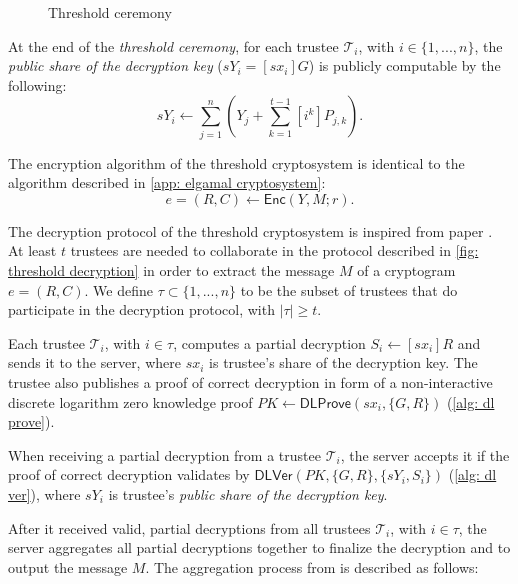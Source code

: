 \begin{figure}[ht]
    \caption{Threshold ceremony}
    \label{fig: threshold ceremony}
\end{figure}

At the end of the \textit{threshold ceremony}, for each trustee $\mathcal{T}_i$, with $i \in \{1, ..., n\}$, the \textit{public share of the decryption key} ($sY_i = [sx_i]G$) is publicly computable by the following:
\[
sY_i \gets \sum\limits_{j=1}^{n} (Y_j + \sum\limits_{k=1}^{t-1} [i^k]P_{j, k}).
\]

The encryption algorithm of the threshold cryptosystem is identical to the algorithm described in \cref{app: elgamal cryptosystem}:
\[
e = (R, C) \gets \mathsf{Enc}(Y, M; r).
\]

The decryption protocol of the threshold cryptosystem is inspired from paper \cite{Desmedt89}. At least $t$ trustees are needed to collaborate in the protocol described in \cref{fig: threshold decryption} in order to extract the message $M$ of a cryptogram $e = (R, C)$. We define $\tau \subset \{1, ..., n\}$ to be the subset of trustees that do participate in the decryption protocol, with $|\tau| \geq t$. 

Each trustee $\mathcal{T}_i$, with $i \in \tau$, computes a partial decryption $S_i \gets [sx_i]R$ and sends it to the server, where $sx_i$ is trustee's share of the decryption key. The trustee also publishes a proof of correct decryption in form of a non-interactive discrete logarithm zero knowledge proof $PK \gets \mathsf{DLProve} (sx_i, \{G, R\})$ (\cref{alg: dl prove}).

When receiving a partial decryption from a trustee $\mathcal{T}_i$, the server accepts it if the proof of correct decryption validates by $\mathsf{DLVer} (PK, \{G, R\}, \{sY_i, S_i\})$ (\cref{alg: dl ver}), where $sY_i$ is trustee's \textit{public share of the decryption key}.

After it received valid, partial decryptions from all trustees $\mathcal{T}_i$, with $i \in \tau$, the server aggregates all partial decryptions together to finalize the decryption and to output the message $M$. The aggregation process from \cite{Desmedt89} is described as follows:

